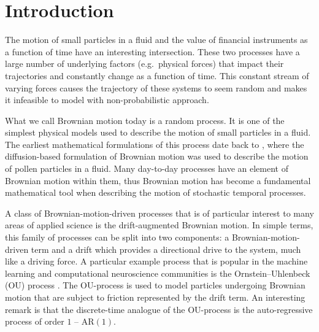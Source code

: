 \documentclass[a4paper,12pt,twoside,openright]{report}
\theoremstyle{definition}
\begin{document}
\pagestyle{empty}
\singlespacing

\onehalfspacing

\singlespacing


\setcounter{page}{0}
\pagestyle{plain}
\tableofcontents
\listoffigures
\listoftables
\onehalfspacing


 \chapter{Introduction}
 
 The motion of small particles in a fluid and the value of financial instruments as a function of time have an interesting intersection. These two processes have a large number of underlying factors (e.g.\ physical forces) that impact their trajectories and constantly change as a function of time. This constant stream of varying forces causes the trajectory of these systems to seem random and makes it infeasible to model with non-probabilistic approach. 
 
 What we call Brownian motion today is a random process. It is one of the simplest physical models used to describe the motion of small particles in a fluid. The earliest mathematical formulations of this process date back to \cite{einstein1905motion}, where the diffusion-based formulation of Brownian motion was used to describe the motion of pollen particles in a fluid. Many day-to-day processes have an element of Brownian motion within them, thus Brownian motion has become a fundamental mathematical tool when describing the motion of stochastic temporal processes.
 
 A class of Brownian-motion-driven processes that is of particular interest to many areas of applied science is the drift-augmented Brownian motion. In simple terms, this family of processes can be split into two components: a Brownian-motion-driven term and a drift which provides a directional drive to the system, much like a driving force. A particular example process that is popular in the machine learning and computational neuroscience communities is the Ornstein–Uhlenbeck (OU) process \citep{doob1942brownian}. The OU-process is used to model particles undergoing Brownian motion that are subject to friction represented by the drift term. An interesting remark is that the discrete-time analogue of the OU-process is the auto-regressive process of order $1$ -- $\text{AR}(1)$.
 
\end{document}
